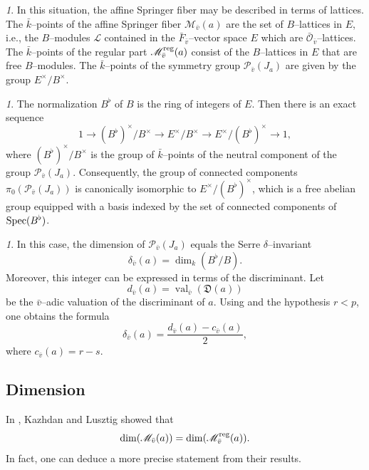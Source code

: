 \documentclass[12pt,english]{smfart}
\numberwithin{equation}{subsection}
\theoremstyle{remark}
\newtheorem{numero}[equation]{}
\newcommand\calP{{\mathscr P}}
\newcommand\calL{{\mathcal L}}
\newcommand\calM{{\mathscr M}}
\newcommand\calO{{\mathscr O}}
\newcommand\Spec{{\rm Spec}}
\newcommand\reg{{\rm reg}}
\newcommand\discrim{\mathfrak D}
\begin{document}
\begin{numero}
In this situation, the affine Springer fiber may be described in terms of lattices. The $\bar{k}$--points of the affine Springer fiber $\calM_{\bar v}(a)$ are the set of $B$--lattices in $E$, i.e., the $B$--modules $\calL$ contained in the $\bar{F}_{\bar v}$--vector space $E$ which are $\bar{\calO}_{\bar v}$--lattices. The $\bar{k}$--points of the regular part $\calM_{\bar v}^\reg(a)$ consist of the $B$--lattices in $E$ that are free $B$--modules. The $\bar{k}$--points of the symmetry group $\calP_{\bar v}(J_a)$ are given by the group $E^\times/B^\times$.
\end{numero}

\begin{numero}
The normalization $B^\flat$ of $B$ is the ring of integers of $E$. Then there is an exact sequence
$$
1\rightarrow (B^\flat)^\times/B^\times \rightarrow E^\times/B^\times \rightarrow E^\times/(B^\flat)^\times \rightarrow 1,
$$
where $(B^\flat)^\times/B^\times$ is the group of $\bar{k}$--points of the neutral component of the group $\calP_{\bar v}(J_a)$. Consequently, the group of connected components $\pi_0(\calP_{\bar v}(J_a))$ is canonically isomorphic to $E^\times/(B^\flat)^\times$, which is a free abelian group equipped with a basis indexed by the set of connected components of $\Spec(B^\flat)$.
\end{numero}

\begin{numero}
In this case, the dimension of $\calP_{\bar v}(J_a)$ equals the Serre $\delta$--invariant
$$
\delta_{\bar v}(a)=\dim_k(B^\flat/B).
$$
Moreover, this integer can be expressed in terms of the discriminant. Let 
$$
d_{\bar v}(a)=\operatorname{val}_{\bar v}(\discrim(a))
$$
be the $\bar{v}$--adic valuation of the discriminant of $a$. Using \cite[III.3 Proposition 5 and III.6 Corollary 1]{Se} and the hypothesis $r<p$, one obtains the formula
$$
\delta_{\bar v}(a)=\frac{d_{\bar v}(a)-c_{\bar v}(a)}{2},
$$
where $c_{\bar v}(a)=r-s$.
\end{numero}

\subsection{Dimension}
\label{dimension}

In \cite{KL}, Kazhdan and Lusztig showed that
$$
\dim(\calM_{\bar v}(a))=\dim(\calM_{\bar v}^\reg(a)).
$$
In fact, one can deduce a more precise statement from their results.
\end{document}
